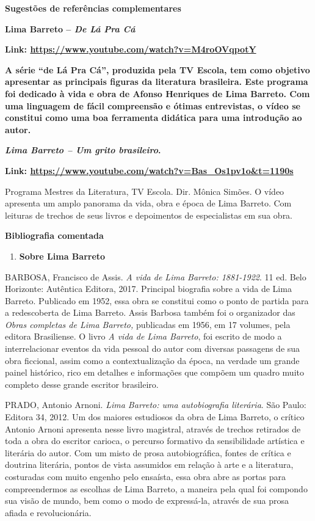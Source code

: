 \textbf{Sugestões de referências complementares}

\textbf{Lima Barreto -- \emph{De Lá Pra Cá} }

\textbf{Link: \url{https://www.youtube.com/watch?v=M4roOVqpotY} }

\textbf{A série ``de Lá Pra Cá'', produzida pela TV Escola, tem como
objetivo apresentar as principais figuras da literatura brasileira. Este
programa foi dedicado à vida e obra de Afonso Henriques de Lima Barreto.
Com uma linguagem de fácil compreensão e ótimas entrevistas, o vídeo se
constitui como uma boa ferramenta didática para uma introdução ao
autor.}

\textbf{\emph{Lima Barreto -- Um grito brasileiro}. }

\textbf{Link: \url{https://www.youtube.com/watch?v=Bas_Os1pv1o\&t=1190s}
}

Programa Mestres da Literatura, TV Escola. Dir. Mônica Simões. O vídeo
apresenta um amplo panorama da vida, obra e época de Lima Barreto. Com
leituras de trechos de seus livros e depoimentos de especialistas em sua
obra.

\textbf{Bibliografia comentada}

\begin{enumerate}
\def\labelenumi{\arabic{enumi})}
\item
  \textbf{Sobre Lima Barreto}
\end{enumerate}

BARBOSA, Francisco de Assis. \emph{A vida de Lima Barreto: 1881-1922}.
11 ed. Belo Horizonte: Autêntica Editora, 2017. Principal biografia
sobre a vida de Lima Barreto. Publicado em 1952, essa obra se constitui
como o ponto de partida para a redescoberta de Lima Barreto. Assis
Barbosa também foi o organizador das \emph{Obras completas de Lima
Barreto,} publicadas em 1956, em 17 volumes, pela editora Brasiliense. O
livro \emph{A vida de Lima Barreto}, foi escrito de modo a
interrelacionar eventos da vida pessoal do autor com diversas passagens
de sua obra ficcional, assim como a contextualização da época, na
verdade um grande painel histórico, rico em detalhes e informações que
compõem um quadro muito completo desse grande escritor brasileiro.

PRADO, Antonio Arnoni. \emph{Lima Barreto: uma autobiografia literária}.
São Paulo: Editora 34, 2012. Um dos maiores estudiosos da obra de Lima
Barreto, o crítico Antonio Arnoni apresenta nesse livro magistral,
através de trechos retirados de toda a obra do escritor carioca, o
percurso formativo da sensibilidade artística e literária do autor. Com
um misto de prosa autobiográfica, fontes de crítica e doutrina
literária, pontos de vista assumidos em relação à arte e a literatura,
costuradas com muito engenho pelo ensaísta, essa obra abre as portas
para compreendermos as escolhas de Lima Barreto, a maneira pela qual foi
compondo sua visão de mundo, bem como o modo de expressá-la, através de
sua prosa afiada e revolucionária.


